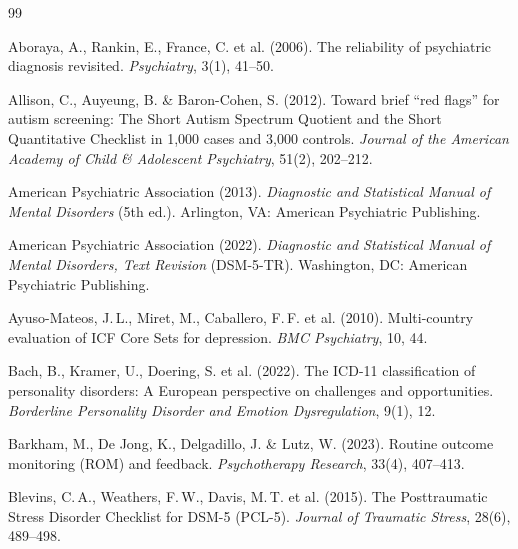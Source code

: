 \documentclass[11pt,a4paper]{article}
\begin{document}
\newpage
\begin{thebibliography}{99}

Aboraya, A., Rankin, E., France, C. et al. (2006).
\newblock The reliability of psychiatric diagnosis revisited.
\newblock \textit{Psychiatry}, 3(1), 41--50.

Allison, C., Auyeung, B. \& Baron-Cohen, S. (2012).
\newblock Toward brief ``red flags'' for autism screening: The Short Autism Spectrum Quotient and the Short Quantitative Checklist in 1,000 cases and 3,000 controls.
\newblock \textit{Journal of the American Academy of Child \& Adolescent Psychiatry}, 51(2), 202--212.

American Psychiatric Association (2013).
\newblock \textit{Diagnostic and Statistical Manual of Mental Disorders} (5th ed.).
\newblock Arlington, VA: American Psychiatric Publishing.

American Psychiatric Association (2022).
\newblock \textit{Diagnostic and Statistical Manual of Mental Disorders, Text Revision} (DSM-5-TR).
\newblock Washington, DC: American Psychiatric Publishing.

Ayuso-Mateos, J.\,L., Miret, M., Caballero, F.\,F. et al. (2010).
\newblock Multi-country evaluation of ICF Core Sets for depression.
\newblock \textit{BMC Psychiatry}, 10, 44.

Bach, B., Kramer, U., Doering, S. et al. (2022).
\newblock The ICD-11 classification of personality disorders: A European perspective on challenges and opportunities.
\newblock \textit{Borderline Personality Disorder and Emotion Dysregulation}, 9(1), 12.

Barkham, M., De Jong, K., Delgadillo, J. \& Lutz, W. (2023).
\newblock Routine outcome monitoring (ROM) and feedback.
\newblock \textit{Psychotherapy Research}, 33(4), 407--413.

Blevins, C.\,A., Weathers, F.\,W., Davis, M.\,T. et al. (2015).
\newblock The Posttraumatic Stress Disorder Checklist for DSM-5 (PCL-5).
\newblock \textit{Journal of Traumatic Stress}, 28(6), 489--498.


\end{thebibliography}
\end{document}

